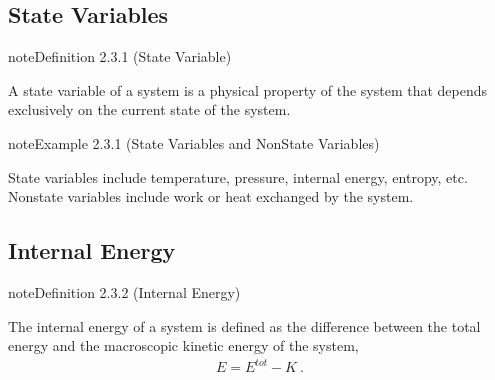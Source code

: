 \documentclass[letterpaper,10pt,english]{jupyterBook}
\begin{document}
\subsection{State Variables}
\label{\detokenize{ch/principles-gibbs-phase-rule:state-variables}}\label{\detokenize{ch/principles-gibbs-phase-rule:physics-hs-thermodynamics-foundation-principles-gibbs-phase-rule-state-vars}}\label{ch/principles-gibbs-phase-rule:definition-0}
\begin{sphinxadmonition}{note}{Definition 2.3.1 (State Variable)}



\sphinxAtStartPar
A state variable of a system is a physical property of the system that depends exclusively on the current state of the system.
\end{sphinxadmonition}
\label{ch/principles-gibbs-phase-rule:example-1}
\begin{sphinxadmonition}{note}{Example 2.3.1 (State Variables and Non\sphinxhyphen{}State Variables)}



\sphinxAtStartPar
State variables include temperature, pressure, internal energy, entropy, etc.
Non\sphinxhyphen{}state variables include work or heat exchanged by the system. 
\end{sphinxadmonition}


\subsection{Internal Energy}
\label{\detokenize{ch/principles-gibbs-phase-rule:internal-energy}}\label{\detokenize{ch/principles-gibbs-phase-rule:physics-hs-thermodynamics-foundation-principles-gibbs-phase-rule-internal-energy}}\label{ch/principles-gibbs-phase-rule:definition-2}
\begin{sphinxadmonition}{note}{Definition 2.3.2 (Internal Energy)}



\sphinxAtStartPar
The internal energy of a system is defined as the difference between the total energy and the macroscopic kinetic energy of the system,
\begin{equation*}
\begin{split}E = E^{tot} - K \ .\end{split}
\end{equation*}\end{sphinxadmonition}
\end{document}
